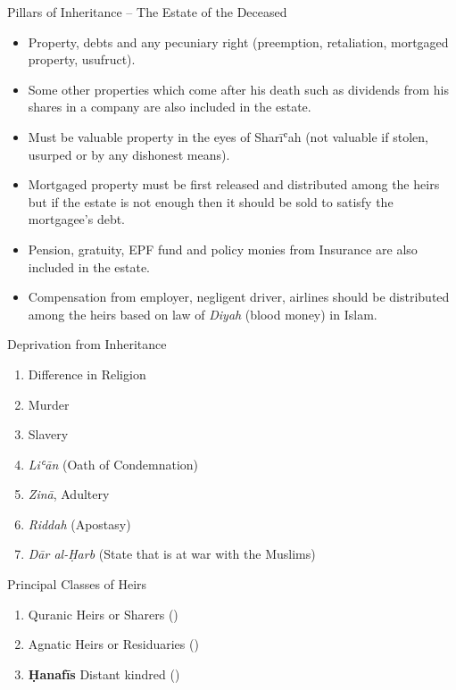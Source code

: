 \begin{frame}{Pillars of Inheritance -- The Estate of the Deceased \hfill{}}
\begin{itemize}
\item Property, debts and any pecuniary right (preemption, retaliation, mortgaged property, usufruct).
\item Some other properties which come after his death such as dividends from his shares in a company are also included in the estate.
\item Must be valuable property in the eyes of Sharīʿah (not valuable if stolen, usurped or by any dishonest means).
\item Mortgaged property must be first released and distributed among the heirs but if the estate is not enough then it should be sold to satisfy the mortgagee’s debt.
\item Pension, gratuity, EPF fund and policy monies from Insurance are also included in the estate.
\item Compensation from employer, negligent driver, airlines should be distributed among the heirs based on law of \textit{Diyah} (blood money) in Islam.
\end{itemize}
\end{frame}

\begin{frame}{Deprivation from Inheritance}
\begin{enumerate}
\item Difference in Religion
\item Murder
\item Slavery
\item \textit{Liʿān} (Oath of Condemnation)
\item \textit{Zinā}, Adultery
\item \textit{Riddah} (Apostasy)
\item \textit{Dār al-Ḥarb} (State that is at war with the Muslims)
\end{enumerate}
\end{frame}

\begin{frame}{Principal Classes of Heirs}
\begin{enumerate}
\item Quranic Heirs or Sharers (\arabicsans{})
\item Agnatic Heirs or Residuaries (\arabicsans{})
\item \textbf{Ḥanafīs} Distant kindred (\arabicsans{})
\end{enumerate}
\end{frame}

